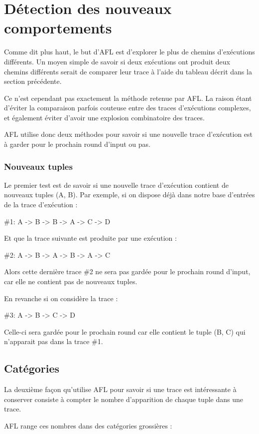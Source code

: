 \section{Détection des nouveaux comportements}\label{nouveaux_comportements}

Comme dit plus haut, le but d'AFL est d'explorer le plus de chemins
d'exécutions différents. Un moyen simple de savoir si deux exécutions
ont produit deux chemins différents serait de comparer leur trace à
l'aide du tableau décrit dans la section précédente.

Ce n'est cependant pas exactement la méthode retenue par AFL. La raison
étant d'éviter la comparaison parfois couteuse entre des traces
d'exécutions complexes, et également éviter d'avoir une explosion
combinatoire des traces.

AFL utilise donc deux méthodes pour savoir si une nouvelle trace d'exécution
est à garder pour le prochain round d'input ou pas.

\subsubsection{Nouveaux tuples}
Le premier test est de savoir si une nouvelle trace d'exécution contient de
nouveaux tuples (A, B). Par exemple, si on dispose déjà dans notre base
d'entrées de la trace d'exécution :

\#1: A -> B -> B -> A -> C -> D

Et que la trace suivante est produite par une exécution :

\#2: A -> B -> A -> B -> A -> C

Alors cette dernière trace \#2 ne sera pas gardée pour le prochain round
d'input, car elle ne contient pas de nouveaux tuples.

En revanche si on considère la trace :

\#3: A -> B -> C -> D

Celle-ci sera gardée pour le prochain round car elle contient le tuple
(B, C) qui n'apparait pas dans la trace \#1.

\subsection{Catégories}

La deuxième façon qu'utilise AFL pour savoir si une trace est
intéressante à conserver consiste à compter le nombre d'apparition de
chaque tuple dans une trace.

AFL range ces nombres dans des catégories grossières :

